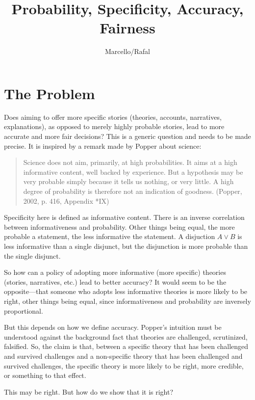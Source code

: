 \documentclass[
  11pt,
  dvipsnames,enabledeprecatedfontcommands]{scrartcl}
\title{Probability, Specificity, Accuracy, Fairness}
\author{Marcello/Rafal}
\date{}
\begin{document}
\maketitle

\hypertarget{the-problem}{%
\section{The Problem}\label{the-problem}}

Does aiming to offer more specific stories (theories, accounts,
narratives, explanations), as opposed to merely highly probable stories,
lead to more accurate and more fair decisions? This is a generic
question and needs to be made precise. It is inspired by a remark made
by Popper about science:

\begin{quote}
Science does not aim, primarily, at high probabilities. It aims at a high informative content, well backed by experience. But a hypothesis may be very probable simply because it tells us nothing, or very little. A high degree of probability is therefore not an indication of goodness. (Popper, 2002, p. 416, Appendix *IX)
\end{quote}

Specificity here is defined as informative content. There is an inverse
correlation between informativeness and probability. Other things being
equal, the more probable a statement, the less informative the
statement. A disjuction \(A\vee B\) is less informative than a single
disjunct, but the disjunction is more probable than the single disjunct.

So how can a policy of adopting more informative (more specific)
theories (stories, narratives, etc.) lead to better accuracy? It would
seem to be the opposite---that someone who adopts less informative
theories is more likely to be right, other things being equal, since
informativeness and probability are inversely proportional.

But this depends on how we define accuracy. Popper's intuition must be
understood against the background fact that theories are challenged,
scrutinized, falsified. So, the claim is that, between a specific theory
that has been challenged and survived challenges and a non-specific
theory that has been challenged and survived challenges, the specific
theory is more likely to be right, more credible, or something to that
effect.

This may be right. But how do we show that it is right?
\end{document}
